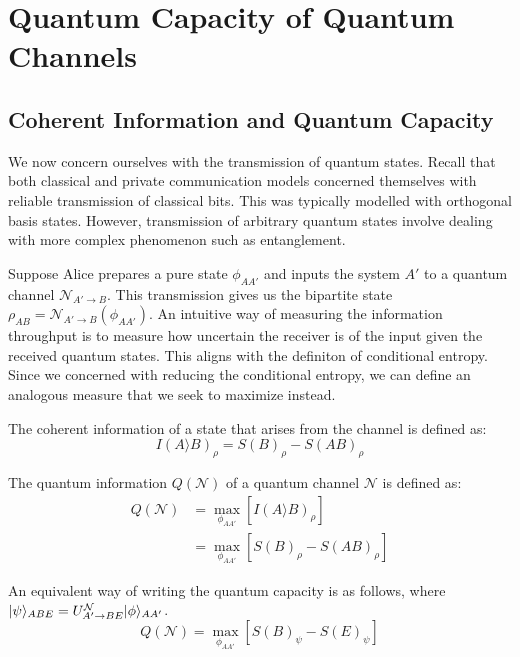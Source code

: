 \section{Quantum Capacity of Quantum Channels}

\subsection{Coherent Information and Quantum Capacity}

We now concern ourselves with the transmission of quantum states. Recall that both classical and private communication models concerned themselves with reliable transmission of classical bits. This was typically modelled with orthogonal basis states. However, transmission of arbitrary quantum states involve dealing with more complex phenomenon such as entanglement.

Suppose Alice prepares a pure state $\phi_{AA'}$ and inputs the system $A'$ to a quantum channel $\mathcal{N}_{A' \rightarrow B}$. This transmission gives us the bipartite state $\rho_{AB} = \mathcal{N}_{A' \rightarrow B} (\phi_{AA'})$. An intuitive way of measuring the information throughput is to measure how uncertain the receiver is of the input given the received quantum states. This aligns with the definiton of conditional entropy. Since we concerned with reducing the conditional entropy, we can define an analogous measure that we seek to maximize instead.

\begin{definition}
The coherent information of a state that arises from the channel is defined as:
$$I(A \rangle B)_{\rho} = S(B)_{\rho} - S(AB)_{\rho}$$
\end{definition}

\begin{definition}
The quantum information $Q(\mathcal{N})$ of a quantum channel $\mathcal{N}$ is defined as:
\begin{align*}
Q(\mathcal{N}) &= \max_{\phi_{AA'}} \left[ I(A \rangle B)_{\rho} \right] \\
&= \max_{\phi_{AA'}} \left[ S(B)_\rho - S(AB)_\rho \right]
\end{align*}
\end{definition}

\noindent An equivalent way of writing the quantum capacity is as follows, where $\lvert\psi\rangle_{ABE} = U_{A' \rightarrow BE}^{\mathcal{N}} \lvert\phi\rangle_{AA'}$.
$$Q(\mathcal{N}) = \max_{\phi_{AA'}} \left[ S(B)_\psi - S(E)_\psi \right]$$

